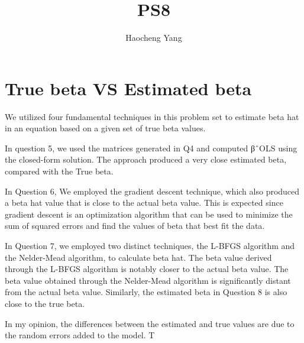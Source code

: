 \documentclass{article}
\title{PS8}
\author{Haocheng Yang}
\begin{document}
\maketitle

\section{True beta VS Estimated beta}

We utilized four fundamental techniques in this problem set to estimate beta hat in an equation based on a given set of true beta values.

In question 5, we used the matrices generated in Q4 and computed βˆOLS using the closed-form solution. The approach produced a very close estimated beta, compared with the True beta.

In Question 6, We employed the gradient descent technique, which also produced a beta hat value that is close to the actual beta value. This is expected since gradient descent is an optimization algorithm that can be used to minimize the sum of squared errors and find the values of beta that best fit the data.

In Question 7, we employed two distinct techniques, the L-BFGS algorithm and the Nelder-Mead algorithm, to calculate beta hat. The beta value derived through the L-BFGS algorithm is notably closer to the actual beta value. The beta value obtained through the Nelder-Mead algorithm is significantly distant from the actual beta value. Similarly, the estimated beta in Question 8 is also close to the true beta.

In my opinion, the differences between the estimated and true values are due to the random errors added to the model. T
\end{document}
